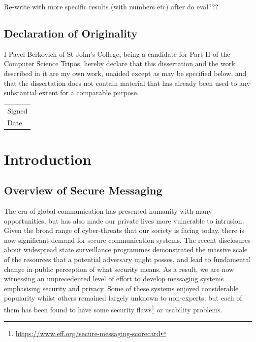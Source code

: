 \documentclass[a4paper, 12pt]{report}
\newcommand{\skippage}{\newpage\null\newpage}
\begin{document}
{\color{red} 
Re-write with more specific results (with numbers etc) after do eval???}

\pagebreak
\section*{Declaration of Originality}
I Pavel Berkovich of St John's College, being a candidate for Part II of the Computer Science Tripos, hereby declare that this dissertation and the work described in it are my own work, unaided except as may be specified below, and that the dissertation does not contain material that has already been used to any substantial extent for a comparable purpose. \\[0.8cm]
\begin{tabular}{l}
    Signed \\[0.8cm]
    Date
\end{tabular}
\vfill

\tableofcontents

\skippage

\pagestyle{headings}

\chapter{Introduction}
\label{ch:intro}

\section{Overview of Secure Messaging}
\label{sec:intro.overview_sec_mess}
The era of global communication has presented humanity with many opportunities, but has also made our private lives more vulnerable to intrusion. Given the broad range of cyber-threats that our society is facing today, there is now significant demand for secure communication systems. The recent disclosures about widespread state surveillance programmes demonstrated the massive scale of the resources that a potential adversary might posses, and lead to fundamental change in public perception of what security means. As a result, we are now witnessing an unprecedented level of effort to develop messaging systems emphasising security and privacy. Some of these systems enjoyed considerable popularity whilst others remained largely unknown to non-experts, but each of them has been found to have some security flaws\footnote{\url{https://www.eff.org/secure-messaging-scorecard}} or usability problems.\\
\end{document}

